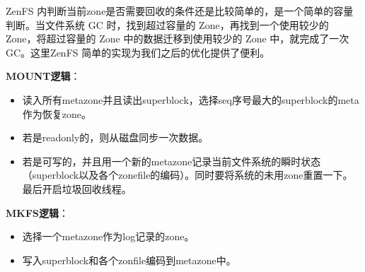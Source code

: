 ZenFS 内判断当前zone是否需要回收的条件还是比较简单的，是一个简单的容量判断。当文件系统 GC 时，找到超过容量的 Zone，再找到一个使用较少的 Zone，将超过容量的 Zone 中的数据迁移到使用较少的 Zone 中，就完成了一次 GC。这里ZenFS 简单的实现为我们之后的优化提供了便利。

\textbf{MOUNT逻辑}：

\begin{itemize}
  \item 读入所有metazone并且读出superblock，选择seq序号最大的superblock的meta作为恢复zone。
  \item 若是readonly的，则从磁盘同步一次数据。
  \item 若是可写的，并且用一个新的metazone记录当前文件系统的瞬时状态（superblock以及各个zonefile的编码）。同时要将系统的未用zone重置一下。最后开启垃圾回收线程。
\end{itemize}

\textbf{MKFS逻辑}：

\begin{itemize}
  \item 选择一个metazone作为log记录的zone。
  \item 写入superblock和各个zonfile编码到metazone中。
\end{itemize}